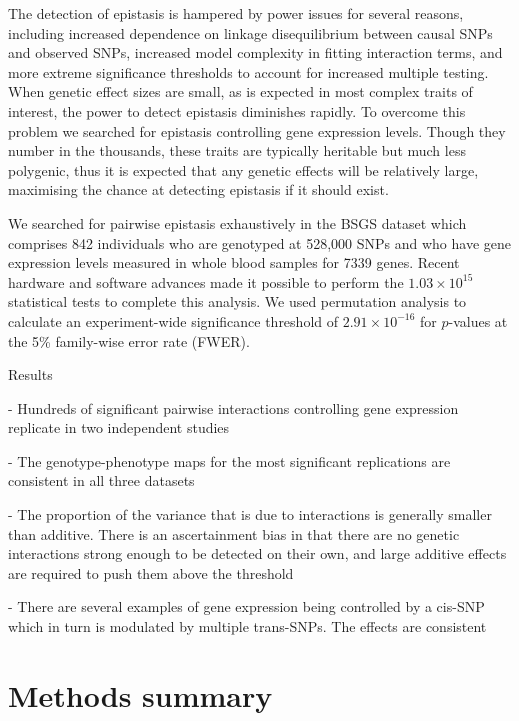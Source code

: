 \documentclass{article}
\begin{document}
The detection of epistasis is hampered by power issues for several reasons, including increased dependence on linkage disequilibrium between causal SNPs and observed SNPs, increased model complexity in fitting interaction terms, and more extreme significance thresholds to account for increased multiple testing. When genetic effect sizes are small, as is expected in most complex traits of interest, the power to detect epistasis diminishes rapidly. To overcome this problem we searched for epistasis controlling gene expression levels. Though they number in the thousands, these traits are typically heritable but much less polygenic, thus it is expected that any genetic effects will be relatively large, maximising the chance at detecting epistasis if it should exist.

We searched for pairwise epistasis exhaustively in the BSGS dataset which comprises 842 individuals who are genotyped at 528,000 SNPs and who have gene expression levels measured in whole blood samples for 7339 genes. Recent hardware and software advances made it possible to perform the $1.03 \times 10^{15}$ statistical tests to complete this analysis. We used permutation analysis to calculate an experiment-wide significance threshold of $2.91 \times 10^{-16}$ for $p$-values at the 5\% family-wise error rate (FWER).



Results


- Hundreds of significant pairwise interactions controlling gene expression replicate in two independent studies



- The genotype-phenotype maps for the most significant replications are consistent in all three datasets



- The proportion of the variance that is due to interactions is generally smaller than additive. There is an ascertainment bias in that there are no genetic interactions strong enough to be detected on their own, and large additive effects are required to push them above the threshold



- There are several examples of gene expression being controlled by a cis-SNP which in turn is modulated by multiple trans-SNPs. The effects are consistent 






\section{Methods summary}
\end{document}

